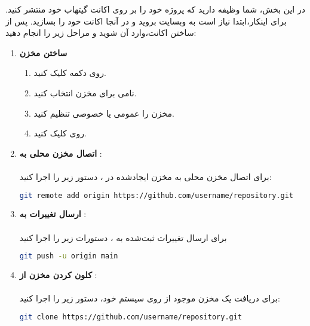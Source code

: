 
در این بخش، شما وظیفه دارید که پروژه خود را بر روی اکانت گیتهاب خود منتشر کنید. برای اینکار،ابتدا نیاز است به وبسایت \href{https://www.github.com}{} بروید و در آنجا اکانت خود را بسازید. پس از ساختن اکانت،وارد آن شوید و مراحل زیر را انجام دهید:

\begin{enumerate}
    \item \textbf{ساختن مخزن}
    \begin{enumerate}
        \item {روی دکمه  کلیک کنید.}
        \item {نامی برای مخزن انتخاب کنید.}
        \item {مخزن را عمومی یا خصوصی تنظیم کنید.}
        \item {روی   کلیک کنید.}
    \end{enumerate}
    \item \textbf{اتصال مخزن محلی به }:\\\\
    برای اتصال مخزن  محلی به مخزن ایجادشده در ، دستور زیر را اجرا کنید:
    
    \begin{terminal}
    \begin{lstlisting}[language=bash]
    git remote add origin https://github.com/username/repository.git
    \end{lstlisting}
    \end{terminal}

    \item \textbf{ارسال تغییرات به }:\\\\
    برای ارسال تغییرات ثبت‌شده به ، دستورات زیر را اجرا کنید
    \begin{terminal}
    \begin{lstlisting}[language=bash]
    git push -u origin main
    \end{lstlisting}
    \end{terminal}  
    
    \item \textbf{کلون کردن مخزن از }:\\\\
    برای دریافت یک مخزن موجود از  روی سیستم خود، دستور زیر را اجرا کنید:
    \begin{terminal}
    \begin{lstlisting}[language=bash]
    git clone https://github.com/username/repository.git
    \end{lstlisting}
    \end{terminal} 


\end{enumerate}

